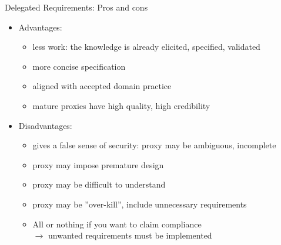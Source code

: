 \begin{Slide}{Delegated Requirements: Pros and cons}
\begin{itemize}
\item Advantages:
\begin{itemize}
\item less work: the knowledge is already elicited, specified, validated
\item more concise specification
\item aligned with accepted domain practice
\item mature proxies have high quality, high credibility

\end{itemize}
\item Disadvantages:
\begin{itemize}
\item gives a false sense of security: proxy may be ambiguous, incomplete
\item proxy may impose premature design
\item proxy may be difficult to understand
\item proxy may be ''over-kill'', include unnecessary requirements
\item All or nothing if you want to claim compliance \\$\rightarrow$ unwanted requirements must be implemented


\end{itemize}
\end{itemize}
\end{Slide}